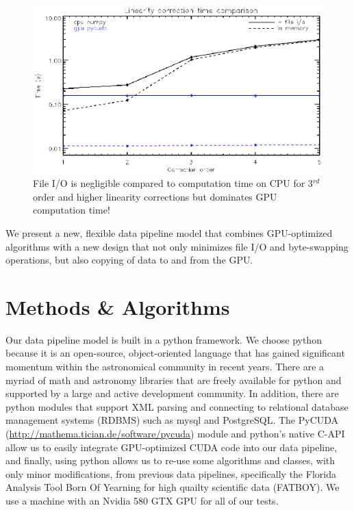 \begin{figure}[!ht]
\includegraphics{part4/Warner_O31/O31_f1.eps}
\caption{File I/O is negligible compared to computation time on CPU for 3$^{rd}$ order and higher linearity corrections but dominates GPU computation time!}
\end{figure}

We present a new, flexible data pipeline model that combines GPU-optimized  
algorithms with a new design that not only minimizes file I/O and
byte-swapping operations, but also copying of data to and from the GPU. 

\section{Methods \& Algorithms}

Our data pipeline model is built in a python framework.  We choose python
because it is an open-source, object-oriented language that has gained
significant momentum within the astronomical community in recent years.
There are a myriad of math and astronomy libraries that are freely available
for python and supported by a large and active development community.  In
addition, there are python modules that support XML parsing and connecting
to relational database management systems (RDBMS) such as mysql and
PostgreSQL.  The PyCUDA
(\url{http://mathema.tician.de/software/pycuda}) module and python's native
C-API allow us to easily integrate GPU-optimized CUDA code into our data
pipeline, and finally, using python allows us to re-use some algorithms
and classes, with only minor modifications, from previous data pipelines,
specifically the Florida Analysis Tool Born Of Yearning for high quailty
scientific data (FATBOY).  We use a machine with an Nvidia 580 GTX GPU for
all of our tests.

